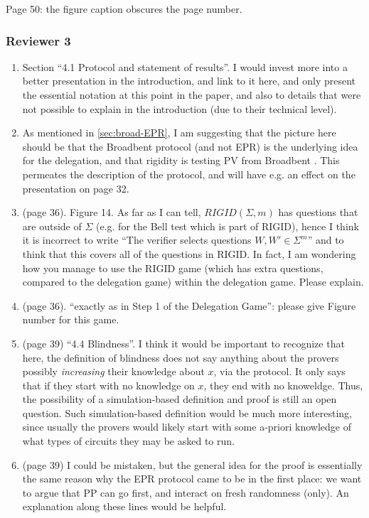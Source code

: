 \documentclass[12pt]{article}
\newcommand{\Broad}{{\sf Broadbent }}
\newcommand{\EPR}{{\sf EPR }}
\begin{document}
Page 50: the figure caption obscures the page number.


\subsubsection*{Reviewer 3}
\begin{enumerate}
\item Section ``4.1 Protocol and statement of results''. I would invest more into a better presentation in the introduction, and link to it here, and only present the essential notation at this point in the paper, and also to details that were not possible to explain in the introduction (due to their technical level).
 \item As mentioned in \ref{sec:broad-EPR}, I am suggesting that the picture here should be that the \Broad protocol (and not EPR) is the underlying idea for the delegation, and that rigidity is testing PV from \Broad. This permeates the description of the protocol, and will have e.g. an effect on the presentation on page 32.
     \item (page 36). Figure 14. As far as I can tell, $RIGID(\Sigma, m)$ has questions that are outside of $\Sigma$ (e.g. for the Bell test which is part of RIGID), hence I think it is incorrect to write ``The verifier selects questions $W, W' \in \Sigma^m$'' and to think that this covers all of the questions in RIGID. In fact, I am wondering how you manage to use the RIGID game (which has extra questions, compared to the delegation game) within the delegation game. Please explain.
         \item (page 36). ``exactly as in Step 1 of the Delegation Game'': please give Figure number for this game.
\item (page 39) ``4.4 Blindness''. I think it would be important to recognize that here, the definition of blindness does not say anything about the provers possibly \emph{increasing} their knowledge about $x$, via the protocol. It only says that if they start with no knowledge on $x$, they end with no knoweldge. Thus, the possibility of a simulation-based definition and proof is still an open question. Such simulation-based definition would be much more interesting, since usually the provers would likely start with some a-priori knowledge of what types of circuits they may be asked to run.
\item (page 39)
      I could be mistaken, but the general idea for the proof is essentially the same reason why the \EPR protocol came to be in the first place: we want to argue that PP can go first, and interact on fresh randomness (only). An explanation along these lines would be helpful.


\end{enumerate}
\end{document}
